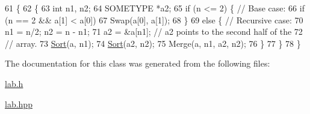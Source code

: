 \begin{DoxyCode}
61 \{
62     \{
63     \textcolor{keywordtype}{int} n1, n2;
64     SOMETYPE *a2;
65     \textcolor{keywordflow}{if} (n <= 2) \{ \textcolor{comment}{// Base case:}
66         \textcolor{keywordflow}{if} (n == 2 && a[1] < a[0])
67             Swap(a[0], a[1]);
68     \}
69     \textcolor{keywordflow}{else} \{ \textcolor{comment}{// Recursive case:}
70         n1 = n/2; n2 = n - n1;
71         a2 = &a[n1]; \textcolor{comment}{// a2 points to the second half of the}
72         \textcolor{comment}{// array.}
73         \hyperlink{classMERGESORT_a8af2add54cd2f739b68dca4750704c6c}{Sort}(a, n1);
74         \hyperlink{classMERGESORT_a8af2add54cd2f739b68dca4750704c6c}{Sort}(a2, n2);
75         Merge(a, n1, a2, n2);
76     \}
77 \}
78 \}
\end{DoxyCode}


The documentation for this class was generated from the following files\+:\begin{DoxyCompactItemize}
\item 
\hyperlink{lab_8h}{lab.\+h}\item 
\hyperlink{lab_8hpp}{lab.\+hpp}\end{DoxyCompactItemize}
